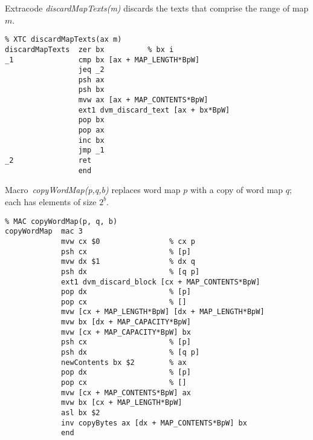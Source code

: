 Extracode \emph{discardMapTexts(m)} discards the texts that comprise the range of map $m$.
\begin{tabbing}
\indents
{}
\fin
\end{tabbing}

{\small
\begin{verbatim}
% XTC discardMapTexts(ax m)
discardMapTexts  zer bx          % bx i
_1               cmp bx [ax + MAP_LENGTH*BpW]
                 jeq _2
                 psh ax
                 psh bx
                 mvw ax [ax + MAP_CONTENTS*BpW]
                 ext1 dvm_discard_text [ax + bx*BpW]
                 pop bx                 
                 pop ax
                 inc bx
                 jmp _1
_2               ret
                 end
\end{verbatim}}

Macro~\emph{copyWordMap(p,q,b)} replaces word map $p$ with a copy of word map $q$; each has elements of size $2^b$.
\begin{tabbing}
\indents
{}
\fin
\end{tabbing}

{\small
\begin{verbatim}
% MAC copyWordMap(p, q, b)
copyWordMap  mac 3
             mvw cx $0                % cx p
             psh cx                   % [p]
             mvw dx $1                % dx q
             psh dx                   % [q p]
             ext1 dvm_discard_block [cx + MAP_CONTENTS*BpW]
             pop dx                   % [p]
             pop cx                   % []
             mvw [cx + MAP_LENGTH*BpW] [dx + MAP_LENGTH*BpW]
             mvw bx [dx + MAP_CAPACITY*BpW]
             mvw [cx + MAP_CAPACITY*BpW] bx
             psh cx                   % [p]
             psh dx                   % [q p]
             newContents bx $2        % ax
             pop dx                   % [p]
             pop cx                   % []
             mvw [cx + MAP_CONTENTS*BpW] ax
             mvw bx [cx + MAP_LENGTH*BpW]
             asl bx $2
             inv copyBytes ax [dx + MAP_CONTENTS*BpW] bx
             end
\end{verbatim}}

